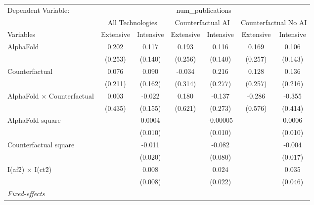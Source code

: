 \begingroup
\centering
\begin{tabular}{lcccccc}
   \tabularnewline \midrule \midrule
   Dependent Variable: & \multicolumn{6}{c}{num\_publications}\\
 & \multicolumn{2}{c}{All Technologies} & \multicolumn{2}{c}{Counterfactual AI} & \multicolumn{2}{c}{Counterfactual No AI} \\
\cmidrule(lr){1-1}\cmidrule(lr){2-3} \cmidrule(lr){4-5} \cmidrule(lr){6-7}
Variables & \multicolumn{1}{c}{Extensive} & \multicolumn{1}{c}{Intensive} & \multicolumn{1}{c}{Extensive} & \multicolumn{1}{c}{Intensive} & \multicolumn{1}{c}{Extensive} & \multicolumn{1}{c}{Intensive} \\
\cmidrule(lr){1-1}\cmidrule(lr){2-2} \cmidrule(lr){3-3} \cmidrule(lr){4-4} \cmidrule(lr){5-5} \cmidrule(lr){6-6} \cmidrule(lr){7-7}
   AlphaFold                          & 0.202   & 0.117   & 0.193   & 0.116    & 0.169   & 0.106\\   
                                      & (0.253) & (0.140) & (0.256) & (0.140)  & (0.257) & (0.143)\\   
   Counterfactual                     & 0.076   & 0.090   & -0.034  & 0.216    & 0.128   & 0.136\\   
                                      & (0.211) & (0.162) & (0.314) & (0.277)  & (0.257) & (0.216)\\   
   AlphaFold $\times$ Counterfactual  & 0.003   & -0.022  & 0.180   & -0.137   & -0.286  & -0.355\\   
                                      & (0.435) & (0.155) & (0.621) & (0.273)  & (0.576) & (0.414)\\   
   AlphaFold square                   &         & 0.0004  &         & -0.00005 &         & 0.0006\\   
                                      &         & (0.010) &         & (0.010)  &         & (0.010)\\   
   Counterfactual square              &         & -0.011  &         & -0.082   &         & -0.004\\   
                                      &         & (0.020) &         & (0.080)  &         & (0.017)\\   
   I(af\^2) $\times$ I(ct\^2)         &         & 0.008   &         & 0.024    &         & 0.035\\   
                                      &         & (0.008) &         & (0.022)  &         & (0.046)\\   
   \midrule
   \emph{Fixed-effects}\\

\end{tabular}
